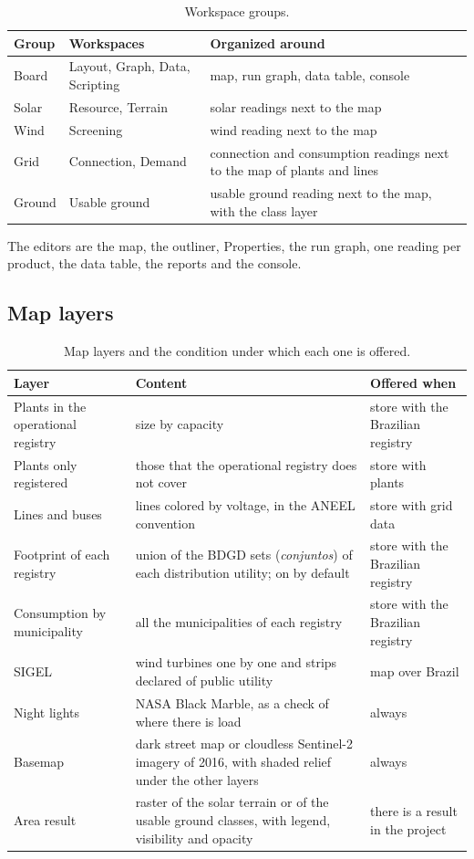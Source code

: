 \documentclass[10pt,a4paper,oneside]{article}
\begin{document}
\begin{table}[H]
\caption{Workspace groups.}
\begin{tabularx}{\linewidth}{l l Y}
\toprule
\textbf{Group} & \textbf{Workspaces} & \textbf{Organized around} \\
\midrule
Board & Layout, Graph, Data, Scripting & map, run graph, data table,
  console \\
Solar & Resource, Terrain & solar readings next to the map \\
Wind & Screening & wind reading next to the map \\
Grid & Connection, Demand & connection and consumption readings next to the
  map of plants and lines \\
Ground & Usable ground & usable ground reading next to the map, with the
  class layer \\
\bottomrule
\end{tabularx}
\end{table}

The editors are the map, the outliner, Properties, the run graph, one reading
per product, the data table, the reports and the console.

\subsection{Map layers}

\begin{table}[H]
\caption{Map layers and the condition under which each one is offered.}
\begin{tabularx}{\linewidth}{L{40mm} Y L{38mm}}
\toprule
\textbf{Layer} & \textbf{Content} & \textbf{Offered when} \\
\midrule
Plants in the operational registry & size by capacity & store with the
  Brazilian registry \\
Plants only registered & those that the operational registry does not cover &
  store with plants \\
Lines and buses & lines colored by voltage, in the ANEEL convention &
  store with grid data \\
Footprint of each registry & union of the BDGD sets (\emph{conjuntos}) of
  each distribution utility; on by default & store with the Brazilian
  registry \\
Consumption by municipality & all the municipalities of each registry & store
  with the Brazilian registry \\
SIGEL & wind turbines one by one and strips declared of public utility &
  map over Brazil \\
Night lights & NASA Black Marble, as a check of where there is load &
  always \\
Basemap & dark street map or cloudless Sentinel-2 imagery of 2016, with
  shaded relief under the other layers & always \\
Area result & raster of the solar terrain or of the usable ground classes,
  with legend, visibility and opacity & there is a result in the project \\
\bottomrule
\end{tabularx}
\end{table}
\end{document}
